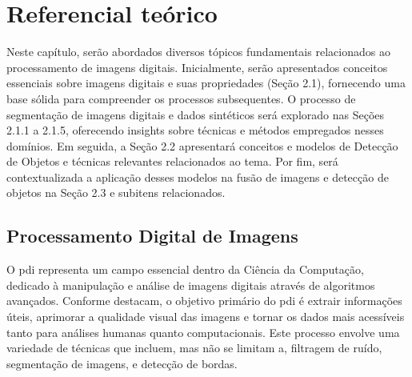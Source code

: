 \chapter{Referencial te\'orico}\label{cap:referencialTeorico}

Neste capítulo, serão abordados diversos tópicos fundamentais relacionados ao processamento de imagens digitais. Inicialmente, serão apresentados conceitos essenciais sobre imagens digitais e suas propriedades (Seção 2.1), fornecendo uma base sólida para compreender os processos subsequentes. O processo de segmentação de imagens digitais e dados sintéticos será explorado nas Seções 2.1.1 a 2.1.5, oferecendo insights sobre técnicas e métodos empregados nesses domínios. Em seguida, a Seção 2.2 apresentará conceitos e modelos de Detecção de Objetos e técnicas relevantes relacionados ao tema. Por fim, será contextualizada a aplicação desses modelos na fusão de imagens e detecção de objetos na Seção 2.3 e subitens relacionados.


\section{Processamento Digital de Imagens}\label{sec:fusao}



O \gls{pdi} representa um campo essencial dentro da Ciência da Computação, dedicado à manipulação e análise de imagens digitais através de algoritmos avançados. Conforme  destacam, o objetivo primário do \gls{pdi} é extrair informações úteis, aprimorar a qualidade visual das imagens e tornar os dados mais acessíveis tanto para análises humanas quanto computacionais. Este processo envolve uma variedade de técnicas que incluem, mas não se limitam a, filtragem de ruído, segmentação de imagens, e detecção de bordas.

